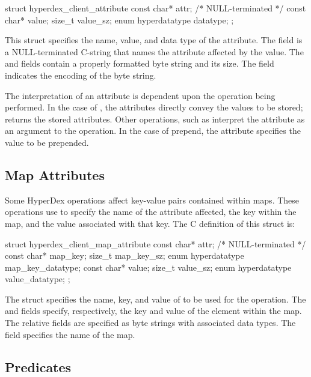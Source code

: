 \begin{ccode}
struct hyperdex_client_attribute
{
    const char* attr; /* NULL-terminated */
    const char* value;
    size_t value_sz;
    enum hyperdatatype datatype;
};
\end{ccode}

This struct specifies the name, value, and data type of the attribute.  The
 field is a NULL-terminated C-string that names the attribute
affected by the value.  The  and  fields contain a
properly formatted byte string and its size.  The  field
indicates the encoding of the byte string.

The interpretation of an attribute is dependent upon the operation being
performed.  In the case of , the attributes directly
convey the values to be stored;  returns the
stored attributes.  Other operations, such as
 interpret the attribute as an argument
to the operation.  In the case of prepend, the attribute specifies the value to
be prepended.

\subsection{Map Attributes}
\label{sec:api:c:client:map-attributes}

Some HyperDex operations affect key-value pairs contained within maps.  These
operations use  to specify the
name of the attribute affected, the key within the map, and the value associated
with that key.  The C definition of this struct is:

\begin{ccode}
struct hyperdex_client_map_attribute
{
    const char* attr; /* NULL-terminated */
    const char* map_key;
    size_t map_key_sz;
    enum hyperdatatype map_key_datatype;
    const char* value;
    size_t value_sz;
    enum hyperdatatype value_datatype;
};
\end{ccode}

The struct specifies the name, key, and value of to be used for the operation.
The  and  fields specify, respectively, the key
and value of the element within the map.  The relative fields are specified as
byte strings with associated data types.  The  field specifies the
name of the map.

\subsection{Predicates}
\label{sec:api:c:client:predicates}

